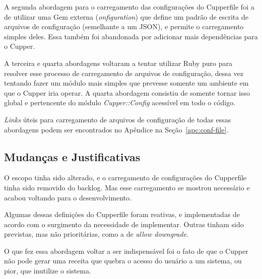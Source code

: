 A segunda abordagem para o carregamento das configurações do Cupperfile foi a de
utilizar uma Gem externa (\textit{onfiguration}) que define um padrão de escrita de 
arquivos de configuração (semelhante a um JSON), e permite o carregamento 
simples deles. Essa também foi abandonada por adicionar mais dependências para o Cupper.

A terceira e quarta abordagens voltaram a tentar utilizar Ruby puro para resolver
esse processo de carregamento de arquivos de configuração, dessa vez tentando 
fazer um módulo mais simples que prevesse somente um ambiente em que o Cupper
iria operar. A quarta abordagem consistiu de somente tornar isso global e
pertencente do módulo \textit{Cupper::Config} acessível em todo o código.

\textit{Links} úteis para carregamento de arquivos de configuração de todas essas
abordagens podem ser encontrados no Apêndice na Seção~\ref{apc:conf-file}.

\subsection{Mudanças e Justificativas}
O escopo tinha sido alterado, e o carregamento de configurações do Cupperfile
tinha sido removido do backlog. Mas esse carregamento se mostrou necessário
e acabou voltando para o desenvolvimento.

Algumas dessas definições do Cupperfile foram reativas, e implementadas de acordo
com o surgimento da necessidade de implementar. Outras tinham sido previstas, mas
não prioritárias, como a de \textit{allow downgrade}.

O que fez essa abordagem voltar a ser indispensável foi o fato de que o Cupper
não pode gerar uma receita que quebra o acesso do usuário a um sistema, ou pior,
que inutilize o sistema.
